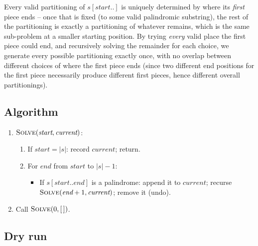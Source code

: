 Every valid partitioning of $s[\textit{start}..]$ is uniquely determined
by where its \emph{first} piece ends -- once that is fixed (to some
valid palindromic substring), the rest of the partitioning is exactly a
partitioning of whatever remains, which is the same sub-problem at a
smaller starting position. By trying \emph{every} valid place the first
piece could end, and recursively solving the remainder for each choice,
we generate every possible partitioning exactly once, with no overlap
between different choices of where the first piece ends (since two
different end positions for the first piece necessarily produce
different first pieces, hence different overall partitionings).

\subsection*{Algorithm}

\begin{enumerate}
  \item $\textsc{Solve}(\textit{start}, \textit{current})$:
  \begin{enumerate}
    \item If $\textit{start} = |s|$: record $\textit{current}$; return.
    \item For $\textit{end}$ from $\textit{start}$ to $|s|-1$:
    \begin{itemize}
      \item If $s[\textit{start}..\textit{end}]$ is a palindrome:
            append it to $\textit{current}$; recurse
            $\textsc{Solve}(\textit{end}+1, \textit{current})$; remove
            it (undo).
    \end{itemize}
  \end{enumerate}
  \item Call $\textsc{Solve}(0, [\,])$.
\end{enumerate}

\subsection*{Dry run}


